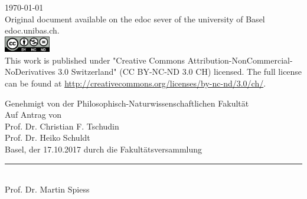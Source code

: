 \begin{titlepage}
\begin{center}
\vfill
{\large \today\\[1cm]}
{\footnotesize Original document available on the edoc sever of the university of Basel edoc.unibas.ch.\\[0.5cm]
\includegraphics[height=7mm]{./inc/cclic.png}~\\[0.5cm]
This work is published under  "Creative Commons Attribution-NonCommercial-NoDerivatives 3.0 Switzerland" (CC BY-NC-ND 3.0 CH) licensed. The full license can be found at \url{http://creativecommons.org/licenses/by-nc-nd/3.0/ch/}.
}

\end{center}
\end{titlepage}\restoregeometry\onecolumn\clearpage\pagestyle{plain}

\begin{center}

Genehmigt von der Philosophisch-Naturwissenschaftlichen Fakult\"at\\
Auf Antrag von\\[0.5cm]
Prof. Dr. Christian F. Tschudin\\Prof. Dr. Heiko Schuldt\\[0.5cm]

Basel, der 17.10.2017 durch die Fakult\"atsversammlung\\[2cm]
{\rule{6cm}{0.2pt}\\ Prof. Dr. Martin Spiess}
\end{center}
\vfill\twocolumn
\begin{abstract}        
		\myabstract
\end{abstract}





